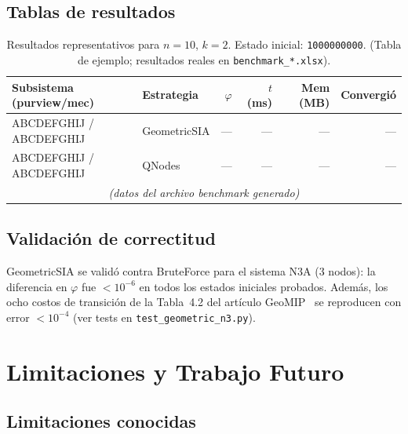 \documentclass[11pt,letterpaper]{article}
\newcommand{\phi}{\varphi}
\begin{document}
\subsection{Tablas de resultados}
\label{sec:tablas}


\begin{table}[H]
  \centering
  \caption{Resultados representativos para $n=10$, $k=2$.
           Estado inicial: \texttt{1000000000}.
           (Tabla de ejemplo; resultados reales en \texttt{benchmark\_*.xlsx}).}
  \label{tab:n10k2}
  \begin{tabular}{l l r r r r}
    \toprule
    Subsistema (purview/mec) & Estrategia & $\phi$ & $t$ (ms) & Mem (MB) & Convergió \\
    \midrule
    ABCDEFGHIJ / ABCDEFGHIJ & GeometricSIA & --- & --- & --- & --- \\
    ABCDEFGHIJ / ABCDEFGHIJ & QNodes       & --- & --- & --- & --- \\
    \multicolumn{6}{c}{\emph{(datos del archivo benchmark generado)}} \\
    \bottomrule
  \end{tabular}
\end{table}

\subsection{Validación de correctitud}

GeometricSIA se validó contra BruteForce para el sistema N3A (3 nodos):
la diferencia en $\phi$ fue $< 10^{-6}$ en todos los estados iniciales
probados.  Además, los ocho costos de transición de la Tabla~4.2 del
artículo GeoMIP~\cite{geomip2025} se reproducen con error $< 10^{-4}$
(ver tests en \texttt{test\_geometric\_n3.py}).

\section{Limitaciones y Trabajo Futuro}
\label{sec:limitaciones}

\subsection{Limitaciones conocidas}
\end{document}
